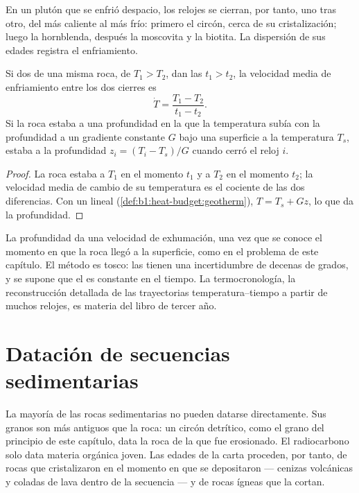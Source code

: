 En un plutón que se enfrió despacio, los relojes se cierran, por tanto, uno tras otro,
del más caliente al más frío: primero el circón, cerca de su cristalización; luego la hornblenda, después la moscovita y la biotita. La dispersión de sus edades registra el enfriamiento.

\begin{proposition}\label{prop:b1:radiometric-methods:cooling}
Si dos  de una misma roca, de  $T_1 > T_2$, dan las  $t_1 > t_2$, la velocidad media de enfriamiento entre los dos cierres es
\[
  \dot T = \frac{T_1 - T_2}{t_1 - t_2}.
\]
Si la roca estaba a una profundidad en la que la temperatura subía con la profundidad a un gradiente constante
$G$ bajo una superficie a la temperatura $T_s$, estaba a la profundidad $z_i
= (T_i - T_s)/G$ cuando cerró el reloj $i$.
\end{proposition}

\begin{proof}
La roca estaba a $T_1$ en el momento $t_1$ y a $T_2$ en el momento $t_2$; la velocidad media de cambio de su temperatura es el cociente de las dos diferencias. Con un
 lineal (\cref{def:b1:heat-budget:geotherm}), $T = T_s + G z$, lo que da la profundidad.
\end{proof}

La profundidad da una velocidad de exhumación, una vez que se conoce el momento en que la roca llegó a la superficie, como en el problema de este capítulo. El método es tosco: las  tienen una incertidumbre de decenas de grados, y se supone que el  es constante en el tiempo. La termocronología, la reconstrucción
detallada de las trayectorias temperatura--tiempo a partir de muchos relojes, es materia del libro de tercer año.

\section{Datación de secuencias sedimentarias}\label{sec:b1:radiometric-methods:sediments}

La mayoría de las rocas sedimentarias no pueden datarse directamente. Sus granos son más antiguos que la roca: un circón detrítico, como el grano del principio de este capítulo, data la roca de la que fue erosionado. El radiocarbono solo data materia orgánica joven. Las edades de la
carta proceden, por tanto, de rocas que cristalizaron en el momento en que se depositaron --- cenizas volcánicas y coladas de lava dentro de la secuencia --- y de rocas ígneas que la cortan.

